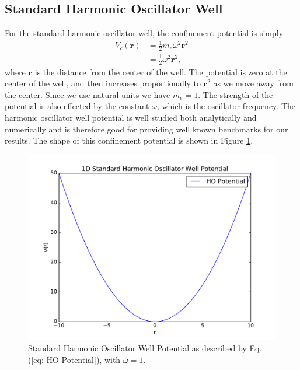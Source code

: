 \documentclass[../main.tex]{subfiles}
\begin{document}
\subsection{Standard Harmonic Oscillator Well}

For the standard harmonic oscillator well, the confinement potential is simply\cite{Griffiths}
\begin{equation}\label{eq: HO Potential}
\begin{split}
    V_c(\mathbf{r}) &= \frac{1}{2}m_e\omega^2 \mathbf{r}^2\\
    &=\frac{1}{2}\omega^2 \mathbf{r}^2,
\end{split}
\end{equation}
where $\mathbf{r}$ is the distance from the center of the well. The potential is zero at the center of the well, and then increases proportionally to $\mathbf{r}^2$ as we move away from the center. Since we use natural units we have $m_e=1$. The strength of the potential is also effected by the constant $\omega$, which is the oscillator frequency. The harmonic oscillator well potential is well studied both analytically and numerically and is therefore good for providing well known benchmarks for our results. The shape of this confinement potential is shown in Figure \ref{fig: HO Potential}.

\begin{figure}[!ht]
    \centering
    \includegraphics[scale=0.7]{figures/HO_Potential}
    \caption{Standard Harmonic Oscillator Well Potential as described by Eq.(\ref{eq: HO Potential}), with $\omega = 1$.}
    \label{fig: HO Potential}
\end{figure}
\end{document}

